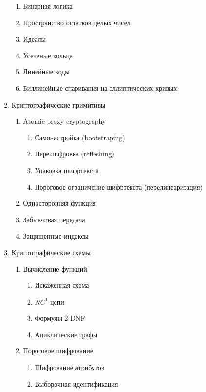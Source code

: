 \begin{enumerate}
		\begin{enumerate}
			\item Бинарная логика
			\item Пространство остатков целых чисел 
			\item Идеалы
			\item Усеченые кольца
			\item Линейные коды
                  \item Биллинейные спаривания на эллиптических кривых
		\end{enumerate}
        \item Криптографические примитивы
		\begin{enumerate}      
                  \item Atomic proxy cryptography
		      \begin{enumerate}
                        \item Самонастройка (bootstraping)
			      \item Перешифровка (refleshing)
			      \item Упаковка шифртекста
			      \item Пороговое ограничение шифртекста (перелинеаризация)
		      \end{enumerate}
                  \item Односторонняя функция
                  \item Забывчивая передача
                  \item Защищенные индексы
		\end{enumerate}
	\item Криптографические схемы
		\begin{enumerate}
	            \item Вычисление функций
		            \begin{enumerate}
	                        \item Искаженная схема
	                        \item $NC^{1}$-цепи
                              \item Формулы 2-DNF
                              \item Ациклические графы
		            \end{enumerate}
	            \item Пороговое шифрование
		            \begin{enumerate}
	                        \item Шифрование атрибутов
	                        \item Выборочная идентификация

\end{enumerate}
\end{enumerate}
\end{enumerate}
